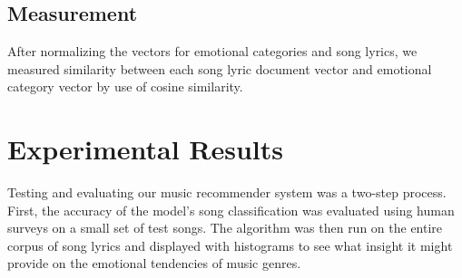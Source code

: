 \documentclass[10pt,twocolumn]{article}
\begin{document}
\subsection{Measurement}

After normalizing the vectors for emotional categories and song lyrics, we measured similarity between each song lyric document vector and emotional category vector by use of cosine similarity.

\section{Experimental Results}
Testing and evaluating our music recommender system was a two-step process. First, the accuracy of the model's song classification was evaluated using human surveys on a small set of test songs. The algorithm was then run on the entire corpus of song lyrics and displayed with histograms to see what insight it might provide on the emotional tendencies of music genres.
\end{document}
